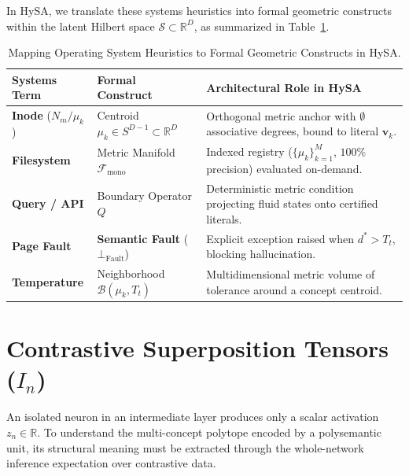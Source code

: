 \documentclass[10pt,twocolumn]{article}
\theoremstyle{definition}
\begin{document}
In HySA, we translate these systems heuristics into formal geometric constructs within the latent Hilbert space $\mathcal{S} \subset \mathbb{R}^D$, as summarized in Table~\ref{tab:terminology}.

\begin{table}[t]
\centering
\caption{Mapping Operating System Heuristics to Formal Geometric Constructs in HySA.}
\label{tab:terminology}
\vspace{0.12cm}
\scriptsize
\setlength{\tabcolsep}{2.5pt}
\begin{tabular}{@{}p{1.8cm}p{2.3cm}p{3.8cm}@{}}
\toprule
\textbf{Systems Term} & \textbf{Formal Construct} & \textbf{Architectural Role in HySA} \\ \midrule
\textbf{Inode} ($N_m / \mu_k$) & Centroid $\mu_k \in S^{D-1} \subset \mathbb{R}^D$ & Orthogonal metric anchor with $\emptyset$ associative degrees, bound to literal $\mathbf{v}_k$. \\[3pt]
\textbf{Filesystem} & Metric Manifold $\mathcal{F}_{\mathrm{mono}}$ & Indexed registry ($\{\mu_k\}_{k=1}^M$, $100\%$ precision) evaluated on-demand. \\[3pt]
\textbf{Query / API} & Boundary Operator $Q$ & Deterministic metric condition projecting fluid states onto certified literals. \\[3pt]
\textbf{Page Fault} & \textbf{Semantic Fault} ($\bot_{\mathrm{Fault}}$) & Explicit exception raised when $d^* > T_t$, blocking hallucination. \\[3pt]
\textbf{Temperature} & Neighborhood $\mathcal{B}(\mu_k, T_t)$ & Multidimensional metric volume of tolerance around a concept centroid. \\ \bottomrule
\end{tabular}
\end{table}

\section{Contrastive Superposition Tensors \texorpdfstring{($I_n$)}{(In)}}
An isolated neuron in an intermediate layer produces only a scalar activation $z_n \in \mathbb{R}$. To understand the multi-concept polytope encoded by a polysemantic unit, its structural meaning must be extracted through the whole-network inference expectation over contrastive data.
\end{document}
